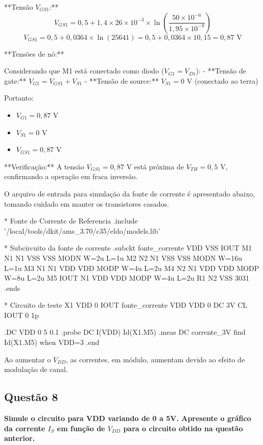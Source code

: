 \documentclass[12pt,a4paper]{article}
\begin{document}
**Tensão $V_{GS1}$:**
$$V_{GS1} = 0,5 + 1,4 \times 26 \times 10^{-3} \times \ln\left(\frac{50 \times 10^{-6}}{1,95 \times 10^{-9}}\right)$$
$$V_{GS1} = 0,5 + 0,0364 \times \ln(25641) = 0,5 + 0,0364 \times 10,15 = 0,87 \text{ V}$$

**Tensões de nó:**

Considerando que M1 está conectado como diodo ($V_{G1} = V_{D1}$):
- **Tensão de gate:** $V_{G1} = V_{GS1} + V_{S1}$
- **Tensão de source:** $V_{S1} = 0$ V (conectado ao terra)

Portanto:
\begin{itemize}
    \item $V_{G1} = 0,87$ V
    \item $V_{S1} = 0$ V
    \item $V_{GS1} = 0,87$ V
\end{itemize}

**Verificação:** A tensão $V_{GS1} = 0,87$ V está próxima de $V_{TH} = 0,5$ V, confirmando a operação em fraca inversão.

O arquivo de entrada para simulação da fonte de corrente é apresentado abaixo, tomando cuidado em manter os transistores casados.

\begin{codeblock}[title={Arquivo de simulação da fonte de corrente}]
* Fonte de Corrente de Referencia
.include '/local/tools/dkit/ams_3.70/c35/eldo/models.lib'

* Subcircuito da fonte de corrente
.subckt fonte_corrente VDD VSS IOUT
M1 N1 N1 VSS VSS MODN W=2u L=1u
M2 N2 N1 VSS VSS MODN W=16u L=1u
M3 N1 N1 VDD VDD MODP W=4u L=2u
M4 N2 N1 VDD VDD MODP W=8u L=2u
M5 IOUT N1 VDD VDD MODP W=4u L=2u
R1 N2 VSS 3031
.ends

* Circuito de teste
X1 VDD 0 IOUT fonte_corrente
VDD VDD 0 DC 3V
CL IOUT 0 1p

.DC VDD 0 5 0.1
.probe DC I(VDD) Id(X1.M5)
.meas DC corrente_3V find Id(X1.M5) when VDD=3
.end
\end{codeblock}

Ao aumentar o $V_{DD}$, as correntes, em módulo, aumentam devido ao efeito de modulação de canal.

\subsection*{Questão 8}

\textbf{Simule o circuito para VDD variando de 0 a 5V. Apresente o gráfico da corrente $I_S$ em função de $V_{DD}$ para o circuito obtido na questão anterior.}
\end{document}
